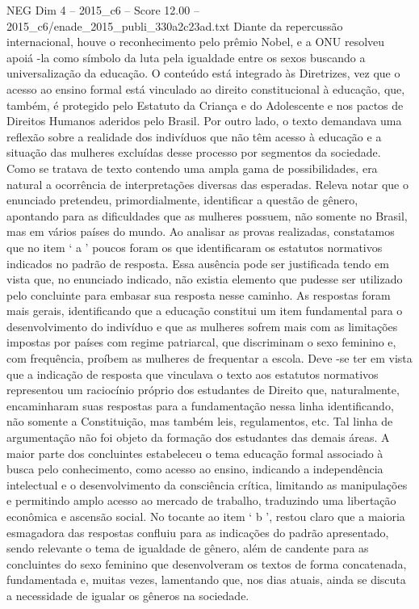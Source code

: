 \begin{textsample}{NEG Dim 4 – 2015\_c6 – Score 12.00 – 2015\_c6/enade\_2015\_publi\_330a2c23ad.txt}
Diante da repercussão internacional, houve o reconhecimento pelo prêmio Nobel, e a ONU resolveu apoiá -la como símbolo da luta pela igualdade entre os sexos buscando a universalização da educação.
O conteúdo está integrado às Diretrizes, vez que o acesso ao ensino formal está vinculado ao direito constitucional à educação, que, também, é protegido pelo Estatuto da Criança e do Adolescente e nos pactos de Direitos Humanos aderidos pelo Brasil.
Por outro lado, o texto demandava uma reflexão sobre a realidade dos indivíduos que não têm acesso à educação e a situação das mulheres excluídas desse processo por segmentos da sociedade.
Como se tratava de texto contendo uma ampla gama de possibilidades, era natural a ocorrência de interpretações diversas das esperadas.
Releva notar que o enunciado pretendeu, primordialmente, identificar a questão de gênero, apontando para as dificuldades que as mulheres possuem, não somente no Brasil, mas em vários países do mundo.
Ao analisar as provas realizadas, constatamos que no item ‘ a ’ poucos foram os que identificaram os estatutos normativos indicados no padrão de resposta.
Essa ausência pode ser justificada tendo em vista que, no enunciado indicado, não existia elemento que pudesse ser utilizado pelo concluinte para embasar sua resposta nesse caminho.
As respostas foram mais gerais, identificando que a educação constitui um item fundamental para o desenvolvimento do indivíduo e que as mulheres sofrem mais com as limitações impostas por países com regime patriarcal, que discriminam o sexo feminino e, com frequência, proíbem as mulheres de frequentar a escola.
Deve -se ter em vista que a indicação de resposta que vinculava o texto aos estatutos normativos representou um raciocínio próprio dos estudantes de Direito que, naturalmente, encaminharam suas respostas para a fundamentação nessa linha identificando, não somente a Constituição, mas também leis, regulamentos, etc.
Tal linha de argumentação não foi objeto da formação dos estudantes das demais áreas.
A maior parte dos concluintes estabeleceu o tema educação formal associado à busca pelo conhecimento, como acesso ao ensino, indicando a independência intelectual e o desenvolvimento da consciência crítica, limitando as manipulações e permitindo amplo acesso ao mercado de trabalho, traduzindo uma libertação econômica e ascensão social.
No tocante ao item ‘ b ’, restou claro que a maioria esmagadora das respostas confluiu para as indicações do padrão apresentado, sendo relevante o tema de igualdade de gênero, além de candente para as concluintes do sexo feminino que desenvolveram os textos de forma concatenada, fundamentada e, muitas vezes, lamentando que, nos dias atuais, ainda se discuta a necessidade de igualar os gêneros na sociedade.

\end{textsample}
